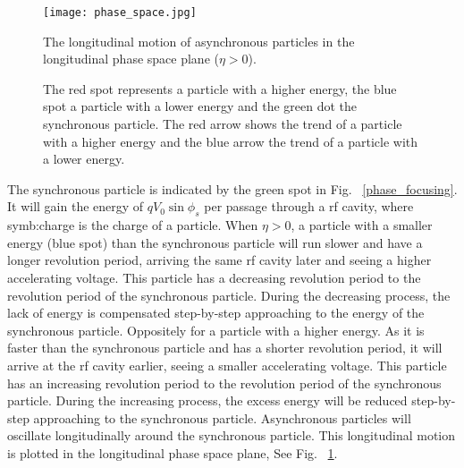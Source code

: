 \begin{figure}[!htb]
   \centering   
   \texttt{[image: phase\_space.jpg]}
   \caption{The longitudinal motion of asynchronous particles in the longitudinal phase space plane ($\eta > 0$).}
	\caption*{The red spot represents a particle with a higher energy, the blue spot a particle with a lower energy and the green dot the synchronous particle. The red arrow shows the trend of a particle with a higher energy and the blue arrow the trend of a particle with a lower energy.}
   \label{phase_space}
\end{figure}
The synchronous particle is indicated by the green spot in Fig. ~\ref{phase_focusing}. It will gain the energy of $qV_0\sin\phi_{\mathit{s}}$ per passage through a rf cavity, where \gls{symb:charge} is the charge of a particle.  When $\eta > 0$, a particle with a smaller energy (blue spot) than the synchronous particle will run slower and have a longer revolution period, arriving the same rf cavity later and seeing a higher accelerating voltage. This particle has a decreasing revolution period to the revolution period of the synchronous particle. During the decreasing process, the lack of energy is compensated step-by-step approaching to the energy of the synchronous particle. Oppositely for a particle with a higher energy. As it is faster than the synchronous particle and has a shorter revolution period, it will arrive at the rf cavity earlier, seeing a smaller accelerating voltage. This particle has an increasing revolution period to the revolution period of the synchronous particle. During the increasing process, the excess energy will be reduced step-by-step approaching to the synchronous particle. Asynchronous particles will oscillate longitudinally around the synchronous particle. This longitudinal motion is plotted in the longitudinal phase space plane, See Fig. ~\ref{phase_space}.

